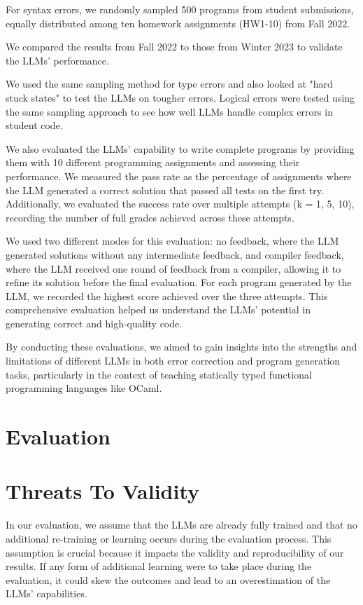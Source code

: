 \documentclass[sigconf,authordraft]{acmart}
\begin{document}
For syntax errors, we randomly sampled 500 programs from student submissions, equally distributed among ten homework assignments (HW1-10) from Fall 2022. 


We compared the results from Fall 2022 to those from Winter 2023 to validate the LLMs' performance.

We used the same sampling method for type errors and also looked at "hard stuck states" to test the LLMs on tougher errors. Logical errors were tested using the same sampling approach to see how well LLMs handle complex errors in student code.

We also evaluated the LLMs' capability to write complete programs by providing them with 10 different programming assignments and assessing their performance. We measured the pass rate as the percentage of assignments where the LLM generated a correct solution that passed all tests on the first try. Additionally, we evaluated the success rate over multiple attempts (k = 1, 5, 10), recording the number of full grades achieved across these attempts.

We used two different modes for this evaluation: no feedback, where the LLM generated solutions without any intermediate feedback, and compiler feedback, where the LLM received one round of feedback from a compiler, allowing it to refine its solution before the final evaluation. For each program generated by the LLM, we recorded the highest score achieved over the three attempts. This comprehensive evaluation helped us understand the LLMs' potential in generating correct and high-quality code.

By conducting these evaluations, we aimed to gain insights into the strengths and limitations of different LLMs in both error correction and program generation tasks, particularly in the context of teaching statically typed functional programming languages like OCaml.
\section{Evaluation}

\section{Threats To Validity}
In our evaluation, we assume that the LLMs are already fully trained and that no additional re-training or learning occurs during the evaluation process. This assumption is crucial because it impacts the validity and reproducibility of our results. If any form of additional learning were to take place during the evaluation, it could skew the outcomes and lead to an overestimation of the LLMs' capabilities.
\end{document}
